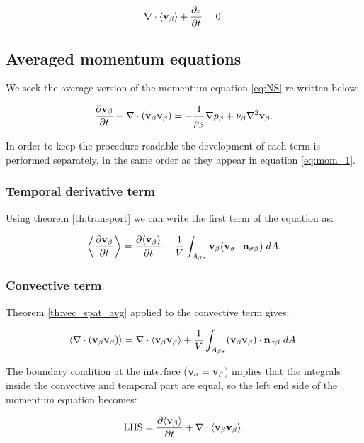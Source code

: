 \begin{equation}
\nabla \cdot {\left< \textbf{v}_{\beta}\right>} + \dfrac{\partial \varepsilon}{\partial t} =0.
\label{eq:avg_1}
\end{equation}


\subsection{Averaged momentum equations}
We seek the average version of the momentum equation \eqref{eq:NS} re-written below:

\begin{equation}
\dfrac{\partial \textbf{v}_{\beta}}{\partial t} + \nabla \cdot (\textbf{v}_{\beta}\textbf{v}_{\beta}) = -\frac{1}{\rho_{\beta}} \nabla p_{\beta} + \nu_{\beta} \nabla^2  \textbf{v}_{\beta}.
\label{eq:mom_1}
\end{equation}

In order to keep the procedure readable the development of each term is performed separately, in the same order as they appear in equation \eqref{eq:mom_1}.

\subsubsection{Temporal derivative term}
Using theorem \eqref{th:transport} we can write the first term of the equation as:

\begin{equation}
{\left< \dfrac{\partial \textbf{v}_{\beta}}{\partial t} \right>} = \dfrac{\partial {\left< \textbf{v}_{\beta}\right>}}{\partial t} -\dfrac{1}{V} \int_{A_{\beta \sigma}}  \textbf{v}_{\beta} (\textbf{v}_{\sigma} \cdot \mathbf{n}_{\sigma \beta} )\;dA.
\end{equation}

\subsubsection{Convective term}
Theorem \eqref{th:vec_spat_avg} applied to the convective term gives:

\begin{equation}
{\left< \nabla \cdot (\textbf{v}_{\beta}\textbf{v}_{\beta}) \right>} = \nabla \cdot {\left< \textbf{v}_{\beta}\textbf{v}_{\beta}\right>} + \dfrac{1}{V} \int_{A_{\beta \sigma}}  (\textbf{v}_{\beta} \textbf{v}_{\beta}) \cdot \mathbf{n}_{\sigma \beta} \;dA.
\end{equation}

The boundary condition at the interface ($\textbf{v}_{\sigma} = \textbf{v}_{\beta}$) implies that the integrals inside the convective and temporal part are equal, so the left end side of the momentum equation becomes:

\begin{equation}
\text{LHS} = \dfrac{\partial {\left< \textbf{v}_{\beta}\right>}}{\partial t} + \nabla \cdot {\left< \textbf{v}_{\beta}\textbf{v}_{\beta}\right>}.
\label{eq:lhs}
\end{equation}

